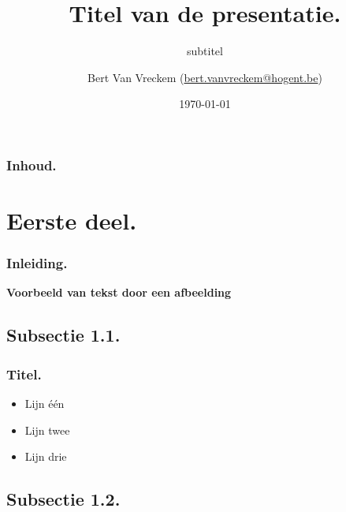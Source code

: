 \documentclass[aspectratio=169]{beamer}
\title[Korte titel]{Titel van de presentatie.}
\subtitle{subtitel}
\author[BVV]{Bert {Van Vreckem} (\href{mailto:bert.vanvreckem@hogent.be}{bert.vanvreckem@hogent.be})}
\date{\today}
\begin{document}
\frame{\maketitle}

\begin{frame}
  \frametitle{Inhoud.}

  \tableofcontents
\end{frame}

\section{Eerste deel.}

\begin{frame}
  \frametitle{Inleiding.}
  
  \lipsum*[2]
\end{frame}

\begin{frame}



{\huge \textbf{Voorbeeld van tekst door een afbeelding}}

\end{frame}

\subsection{Subsectie 1.1.}

\begin{frame}
  \frametitle{Titel.}

  \begin{itemize}
  \item Lijn één
  \item Lijn twee
  \item Lijn drie
  \end{itemize}
\end{frame}

\subsection{Subsectie 1.2.}
\end{document}
